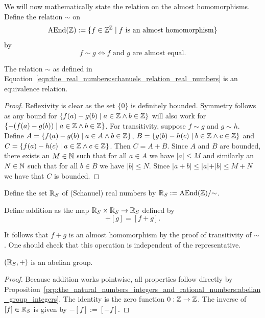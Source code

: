 \documentclass[../main.tex]{subfiles}
\begin{document}
We will now mathematically state the relation on the almost homomorphisms. Define the relation $\sim$ on
\begin{equation*}
    \operatorname{AEnd}(\mathbb{Z}):=\{f\in\mathbb{Z}^{\mathbb{Z}}\mid f\text{ is an almost homomorphism}\}
\end{equation*}
by
\begin{equation}\label{eqn:the_real_numbers:schanuels_relation_real_numbers}
    f\sim g\iff f\text{ and }g\text{ are almost equal}.
\end{equation}
\begin{lemma}
    The relation $\sim$ as defined in Equation~\eqref{eqn:the_real_numbers:schanuels_relation_real_numbers} is an equivalence relation.
\end{lemma}
\begin{proof}
    Reflexivity is clear as the set $\{0\}$ is definitely bounded. Symmetry follows as any bound for $\{f(a)-g(b)\mid a\in\mathbb{Z}\land b\in\mathbb{Z}\}$ will also work for $\{-(f(a)-g(b))
    \mid a\in\mathbb{Z}\land b\in\mathbb{Z}\}$. For transitivity, suppose $f\sim g$ and $g\sim h$. Define $A=\{f(a)-g(b)\mid a\in A\land b\in\mathbb{Z}\}$, $B=\{g(b)-h(c)\mid b\in\mathbb{Z}\land c\in\mathbb{Z}\}$ and $C=\{f(a)-h(c)\mid a\in\mathbb{Z}\land c\in\mathbb{Z}\}$. Then $C=A+B$. Since $A$ and $B$ are bounded, there exists an $M\in\mathbb{N}$ such that for all $a\in A$ we have $\vert a\vert\leq M$ and similarly an $N\in\mathbb{N}$ such that for all $b\in B$ we have $\vert b\vert\leq N$. Since $\vert a+b\vert\leq\vert a\vert+\vert b\vert\leq M+N$ we have that $C$ is bounded.
\end{proof}

\begin{definition}
    Define the set $\mathbb{R}_S$ of (Schanuel) real numbers by $\mathbb{R}_S:=\operatorname{AEnd}(\mathbb{Z})/{\sim}$.
\end{definition}

\begin{definition}
    Define addition as the map $\mathbb{R}_S\times\mathbb{R}_S\to\mathbb{R}_S$ defined by
    \begin{equation*}
        [f]+[g]=[f+g].
    \end{equation*}
\end{definition}
It follows that $f+g$ is an almost homomorphism by the proof of transitivity of $\sim$. One should check that this operation is independent of the representative.
\begin{proposition}\label{prp:the_real_numbers:schanuel_abelian_group_real_numbers}
    $(\mathbb{R}_S,+)$ is an abelian group.
\end{proposition}
\begin{proof}
    Because addition works pointwise, all properties follow directly by Proposition~\ref{prp:the_natural_numbers_integers_and_rational_numbers:abelian_group_integers}. The identity is the zero function $0:\mathbb{Z}\to\mathbb{Z}$. The inverse of $[f]\in\mathbb{R}_S$ is given by $-[f]:=[-f]$.
\end{proof}
\end{document}
